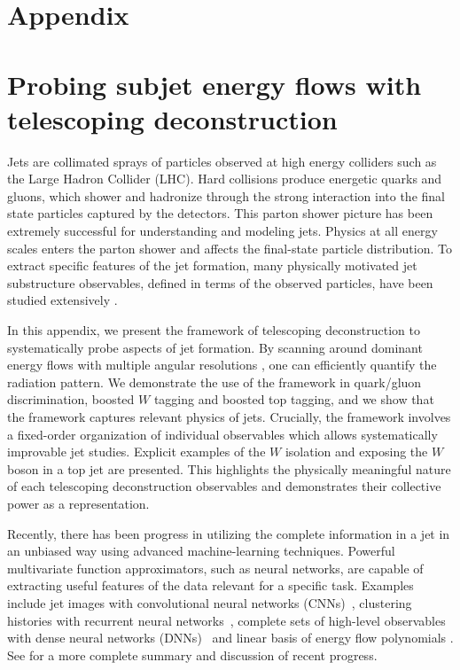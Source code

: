 \documentclass[notoc]{JHEP3}
\begin{document}
\newpage
\appendix
\section*{Appendix}
\section{Probing subjet energy flows with telescoping deconstruction}

Jets are collimated sprays of particles observed at high energy colliders such as the Large Hadron Collider (LHC). Hard collisions produce energetic quarks and gluons, which shower and hadronize through the strong interaction into the final state particles captured by the detectors. This parton shower picture has been extremely successful for understanding and modeling jets. Physics at all energy scales enters the parton shower and affects the final-state particle distribution. To extract specific features of the jet formation, many physically motivated jet substructure observables, defined in terms of the observed particles, have been studied extensively \cite{Abdesselam:2010pt,Altheimer:2012mn,Altheimer:2013yza,Adams:2015hiv,Larkoski:2017jix,ATLAS-CONF-2017-064,Khachatryan:1955546}.

In this appendix, we present the framework of telescoping deconstruction to systematically probe aspects of jet formation. By scanning around dominant energy flows with multiple angular resolutions \cite{Chien:2013kca,Chien:2014hla}, one can efficiently quantify the radiation pattern. We demonstrate the use of the framework in quark/gluon discrimination, boosted $W$ tagging and boosted top tagging, and we show that the framework captures relevant physics of jets. Crucially, the framework involves a fixed-order organization of individual observables which allows systematically improvable jet studies. Explicit examples of the $W$ isolation \cite{Chien:2017xrb} and exposing the $W$ boson in a top jet are presented. This highlights the physically meaningful nature of each telescoping deconstruction observables and demonstrates their collective power as a representation.

Recently, there has been progress in utilizing the complete information in a jet in an unbiased way using advanced machine-learning techniques. Powerful multivariate function approximators, such as neural networks, are capable of extracting useful features of the data relevant for a specific task. Examples include jet images with convolutional neural networks (CNNs)~\cite{Cogan:2014oua,deOliveira:2015xxd,Komiske:2016rsd,Kasieczka:2017nvn}, clustering histories with recurrent neural networks~\cite{Louppe:2017ipp}, complete sets of high-level observables with dense neural networks (DNNs)~\cite{Datta:2017rhs,Datta:2017lxt,Aguilar-Saavedra:2017rzt} and linear basis of energy flow polynomials \cite{Komiske:2017aww}. See \cite{Larkoski:2017jix} for a more complete summary and discussion of recent progress. %
\end{document}
